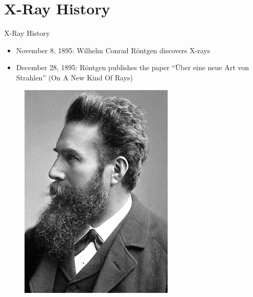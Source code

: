 


\subtitle{X-Ray}



\subtitle{X-Ray}
\frame[plain,c]{\titlepage} %




\section{X-Ray History}

\begin{frame}{X-Ray History}
    \begin{itemize}
        \item November 8, 1895: Wilhelm Conrad Röntgen discovers X-rays
        \item December 28, 1895: Röntgen publishes the paper ``Über eine neue Art von Strahlen'' (On A New Kind Of Rays)
    \end{itemize}
    \begin{figure}[tb]%
        \centering
        \begin{minipage}[t]{0.207\columnwidth}
            \includegraphics[width=1\columnwidth]{images/WilhelmRoentgen}%

\end{minipage}
\end{figure}
\end{frame}
